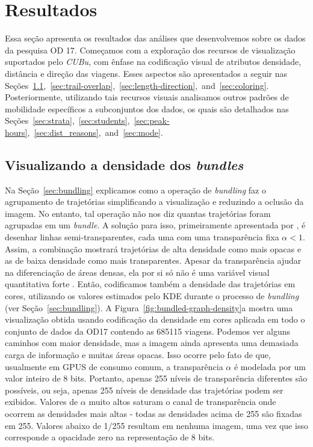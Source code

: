 \chapter{Resultados}
\label{sec:results}

Essa seção apresenta os resultados das análises que desenvolvemos sobre os dados
da pesquisa OD 17. Começamos com a exploração dos recursos de visualização
suportados pelo \emph{CUBu}, com ênfase na codificação visual de atributos
densidade, distância e direção das viagens. Esses aspectos são apresentados a
seguir nas Seções~\ref{sec:density},~\ref{sec:trail-overlap},~\ref{sec:length-direction},~and~\ref{sec:coloring}.
Posteriormente, utilizando tais recursos visuais analisamos outros padrões de
mobilidade específicos a subconjuntos dos dados, os quais são detalhados nas
Seções~\ref{sec:strata},~\ref{sec:students},~\ref{sec:peak-hours},~\ref{sec:dist_reasons},~and~\ref{sec:mode}.

\section{Visualizando a densidade dos \emph{bundles}}
\label{sec:density}

Na Seção~\ref{sec:bundling} explicamos como a operação de \emph{bundling}
faz o agrupamento de trajetórias simplificando a visualização e reduzindo a oclusão
da imagem. No entanto, tal operação não nos diz quantas trajetórias foram agrupadas em
um \emph{bundle}. A solução para isso, primeiramente apresentada por \cite{holten06},
é desenhar linhas semi-transparentes, cada uma com uma transparência fixa $\alpha < 1$.
Assim, a combinação mostrará trajetórias de alta densidade como mais opacas e as de baixa
densidade como mais transparentes. Apesar da transparência ajudar na diferenciação
de áreas densas, ela por si só não é uma variável visual quantitativa forte \cite{slocum09}.
Então, codificamos também a densidade das trajetórias em cores, utilizando
os valores estimados pelo KDE durante o processo de \emph{bundling} (ver Seção~\ref{sec:bundling}).
A Figura~\ref{fig:bundled-graph-density}a mostra uma visualização obtida usando codificação
da densidade em cores aplicada em todo o conjunto de dados da OD17 contendo
as \num{685115} viagens. Podemos ver alguns caminhos com maior densidade, mas a imagem
ainda apresenta uma demasiada carga de informação e muitas áreas opacas. Isso ocorre pelo fato de que,
usualmente em GPUS de consumo comum, a transparência $\alpha$ é modelada por um valor
inteiro de 8 bits. Portanto, apenas 255 níveis de transparência diferentes são possíveis,
ou seja, apenas 255 níveis de densidade das trajetórias podem ser exibidos. Valores
de $\alpha$ muito altos saturam o canal de transparência
onde ocorrem as densidades mais altas - todas as densidades acima de 255 são fixadas
em 255. Valores abaixo de 1/255 resultam em nenhuma imagem, uma vez que
isso corresponde a opacidade zero na representação de 8 bits.

